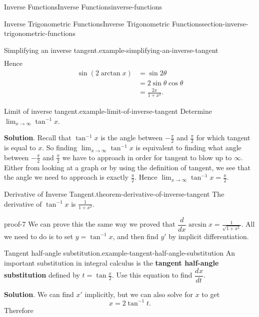\documentclass[oneside,10pt,]{book}
\newcommand{\terminology}[1]{\textbf{#1}}
\numberwithin{equation}{section}
\newcommand{\dv}[3][]{\dfrac{d^{#1} #2}{d #3^{#1}}}
\begin{document}
\begin{chapterptx}{Inverse Functions}{}{Inverse Functions}{}{}{inverse-functions}
\begin{sectionptx}{Inverse Trigonometric Functions}{}{Inverse Trigonometric Functions}{}{}{section-inverse-trigonometric-functions}
\begin{example}{Simplifying an inverse tangent.}{example-simplifying-an-inverse-tangent}
\begin{align*}
\end{align*}
Hence%
\begin{align*}
\sin(2\arctan x) & = \sin2\theta \\
& = 2\sin\theta\cos\theta \\
& = \frac{2x}{1+x^{2}}. 
\end{align*}
%
\end{example}
\begin{example}{Limit of inverse tangent.}{example-limit-of-inverse-tangent}%
\hypertarget{p-276}{}%
Determine \(\lim_{x\to\infty}\tan^{-1}x\).%
\par\smallskip%
\noindent\textbf{Solution}.\hypertarget{solution-60}{}\quad%
\hypertarget{p-277}{}%
Recall that \(\tan^{-1}x\) is the angle between \(-\frac{\pi}{2}\) and \(\frac{\pi}{2}\) for which tangent is equal to \(x\). So finding \(\lim_{x\to\infty}\tan^{-1}x\) is equivalent to finding what angle between \(-\frac{\pi}{2}\) and \(\frac{\pi}{2}\) we have to approach in order for tangent to blow up to \(\infty\). Either from looking at a graph or by using the definition of tangent, we see that the angle we need to approach is exactly \(\frac{\pi}{2}\). Hence \(\lim_{x\to\infty}\tan^{-1}x = \frac{\pi}{2}\).%
\end{example}
\begin{theorem}{Derivative of Inverse Tangent.}{}{theorem-derivative-of-inverse-tangent}%
\hypertarget{p-278}{}%
The derivative of \(\tan^{-1}x\) is \(\frac{1}{1+x^{2}}\).%
\end{theorem}
\begin{proofptx}{}{proof-7}
\hypertarget{p-279}{}%
We can prove this the same way we proved that \(\dv{}{x}\arcsin x = \frac{1}{\sqrt{1+x^{2}}}\). All we need to do is to set \(y = \tan^{-1}x\), and then find \(y'\) by implicit differentiation.%
\end{proofptx}
\begin{example}{Tangent half-angle substitution.}{example-tangent-half-angle-substitution}%
\hypertarget{p-280}{}%
An important substitution in integral calculus is the \terminology{tangent half-angle substitution} defined by \(t = \tan\frac{x}{2}\). Use this equation to find \(\dv{x}{t}\).%
\par\smallskip%
\noindent\textbf{Solution}.\hypertarget{solution-61}{}\quad%
\hypertarget{p-281}{}%
We can find \(x'\) implicitly, but we can also solve for \(x\) to get%
\begin{equation*}
x = 2\tan^{-1}t.
\end{equation*}
Therefore%
\begin{equation*}

\end{equation*}
\end{example}
\end{sectionptx}
\end{chapterptx}
\end{document}
